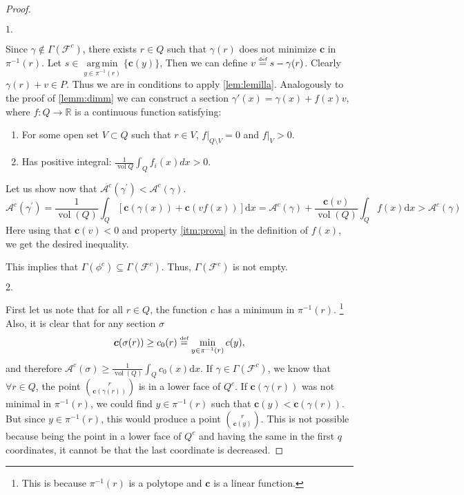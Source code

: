 \documentclass[10pt,a4paper]{article}
\DeclareMathOperator{\vol}{vol}
\DeclareMathOperator*{\argmin}{arg\,min}
\def\defs{\stackrel{\tiny{\mbox{def}}}{=}}		%
\newcommand{\RR}{\mathbb{R}}
\theoremstyle{plain}
\theoremstyle{remark}
\theoremstyle{definition}
\begin{document}
\begin{proof}
    \textcolor{white}{Avada Kedavra}
    
   	$\boxed{1. }$
    
	Since $\gamma\notin\Gamma(\mathcal{F}^c)$, 
	there exists $r\in Q$ such that $\gamma(r)$ does not minimize $\bm{c}$ in $\pi^{-1}(r)$. 
	Let $s \in \argmin\limits_{y\in\pi^{-1}(r)}\{\bm{c}(y)\}$,
	Then we can define $v\defs s - \gamma(r)$. 
	Clearly $\gamma(r)+ v\in P$. 
	Thus we are in conditions to apply \cref{lem:lemilla}.
	Analogously to the proof of \cref{lemm:dimm} we can construct a section 
	$\gamma'(x)=\gamma(x) + f(x)v$, where $f:Q\rightarrow \RR$ is a continuous function satisfying: 
		\begin{enumerate}
			\item For some open set $V\subset Q$ such that $r\in V$, $f|_{Q\setminus V}=0$ and $f|_V>0$.
			\item \label{itm:prova} Has positive integral: 
			$\frac{1}{\vol Q}\int_Q f_i(x) dx > 0$.
		\end{enumerate}
    Let us show now that $\mathcal{A}^c(\gamma^\prime) < \mathcal{A}^c(\gamma)$.
    \begin{equation}
    	 \mathcal{A}^c(\gamma^\prime) = 
         \frac1{\vol(Q)} \int_Q \left[\bm{c}(\gamma(x)) + \bm{c}(vf(x)) \right]\mathrm{ d}x = 
         \mathcal{A}^c(\gamma)  + \frac{\bm{c}(v)}{\vol(Q)}\int_Q f(x)\mathrm{ d}x>  \mathcal{A}^c(\gamma)      
    \end{equation}
    Here using that $\bm{c}(v) < 0$ and property \ref{itm:prova} in the definition of $f(x)$, 
    we get the desired inequality. \par
    This implies that $\Gamma(\phi^c)\subseteq \Gamma(\mathcal{F}^c)$. 
    Thus, $\Gamma(\mathcal{F}^c)$ is not empty.
    
	$\boxed{2.}$
	
	First let us note that for all $r\in Q$, 
	the function $c$ has a minimum in $\pi^{-1}(r)$.
	\footnote{This is because $\pi^{-1}(r)$ is a polytope and $\bm{c}$ is a linear function.}
	Also, it is clear that for any section $\sigma$
	\begin{equation}
		\bm{c}(\sigma(r)) \geq c_0(r) \defs  \min_{y\in\pi^{-1}(r)}c(y),
	\end{equation}
	and therefore 
	$\mathcal{A}^c(\sigma) \geq \frac1{\vol(Q)}\int_Q c_0(x) \mathrm{ d}x$.
	If $\gamma\in \Gamma(\mathcal{F}^c)$, we know that $\forall r\in Q$,
	the point $\binom{r}{\bm{c}(\gamma(r))}$ is in a lower face of $Q^c$. 
	If $\bm{c}(\gamma(r))$ was not minimal in $\pi^{-1}(r)$, 
	we could find $y\in \pi^{-1}(r)$ such that $\bm{c}(y) < \bm{c}( \gamma(r))$.
	But since $y\in\pi^{-1}(r)$, this would produce a point $\binom{r}{\bm{c}(y)}$.
	This is not possible because being the point in a lower face of $Q^c$ 
	and having the same in the first $q$ coordinates, 
	it cannot be that the last coordinate is decreased.
\end{proof}
\end{document}
